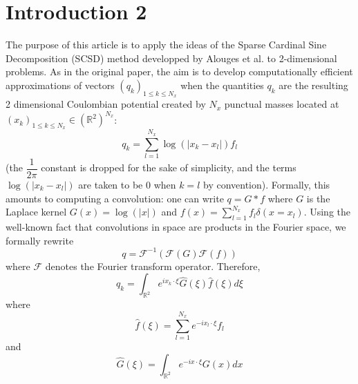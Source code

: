 \documentclass[11pt,a4paper]{article}
\begin{document}
\section*{Introduction 2}

The purpose of this article is to apply the ideas of the Sparse Cardinal Sine Decomposition (SCSD) method developped by Alouges et al. \cite{Alouges2015} to 2-dimensional problems. As in the original paper, the aim is to develop computationally efficient approximations of vectors $(q_k)_{1\leq k \leq N_x}$ when the quantities $q_k$ are the resulting 2 dimensional Coulombian potential created by $N_x$ punctual masses located at $(x_k)_{1 \leq k \leq N_x} \in \left(\mathbb{R}^2\right)^{N_x}$:
\begin{equation}
 q_k = \sum_{l=1}^{N_x} \log(|x_k - x_l|)f_l 
\label{LaSommeACalculerDansLArticle}
\end{equation}
(the $\dfrac{1}{2\pi}$ constant is dropped for the sake of simplicity, and the terms $\log(|x_k - x_l|)$ are taken to be $0$ when $k=l$ by convention). Formally, this amounts to computing a convolution: one can write $q = G*f$ where $G$ is the Laplace kernel $G(x) = \log(|x|)$ and $f(x) = \displaystyle\sum_{l=1}^{N_x}{f_l \delta(x=x_l)}$. Using the well-known fact that convolutions in space are products in the Fourier space, we formally rewrite 
\[ q = \mathcal{F}^{-1}\left( \mathcal{F}(G) \mathcal{F}(f)\right)\]
where $\mathcal{F}$ denotes the Fourier transform operator. Therefore, 
\begin{equation}
\label{ConvolFourier}
q_k = \int_{\mathbb{R}^2} e^{i x_k \cdot \xi} \hat{G}(\xi) \hat{f}(\xi) d\xi
\end{equation}
where 
\[\hat{f}(\xi) = \sum_{l=1}^{N_x} e^{-i x_l \cdot \xi} f_l\]
and 
\[\hat{G}(\xi) = \int_{\mathbb{R}^2} e^{-i x\cdot \xi} G(x) dx\]
\end{document}
